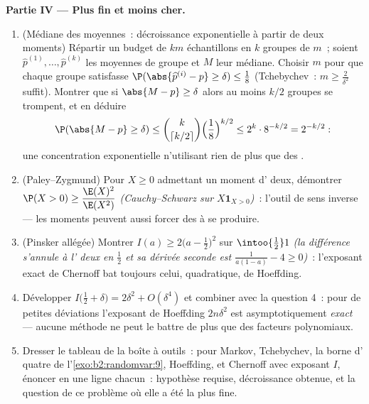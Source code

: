 \begin{problem}
\medskip
\noindent\textbf{Partie IV --- Plus fin et moins cher.}
\begin{enumerate}[resume]
  \item (Médiane des moyennes~: décroissance exponentielle à partir de deux moments)
        Répartir un budget de $km$ échantillons en $k$ groupes
         de $m$~; soient $\widehat p^{(1)}, \dots, \widehat
        p^{(k)}$ les moyennes de groupe et $M$ leur médiane.
        Choisir $m$ pour que chaque groupe satisfasse
        $\P(\abs{\widehat p^{(i)} - p} \geq \delta) \leq
        \frac18$ (Tchebychev~: $m \geq \frac2{\delta^2}$
        suffit). Montrer que si $\abs{M - p} \geq \delta$
        alors au moins $k/2$ groupes se trompent, et en déduire
        \[
        \P(\abs{M - p} \geq \delta)
        \leq \binom{k}{\lceil k/2\rceil}\Bigl(\frac18
        \Bigr)^{k/2}
        \leq 2^k\cdot 8^{-k/2} = 2^{-k/2} :
        \]
        une concentration exponentielle n'utilisant rien de plus que
        des .
  \item (Paley--Zygmund) Pour $X \geq 0$ admettant un moment d' deux,
        démontrer $\P(X > 0) \geq \dfrac{\E(X)^2}{\E(X^2)}$
        \emph{(Cauchy--Schwarz sur $X\mathbf 1_{X>0}$)}~: l'outil
        de sens inverse --- les moments peuvent aussi forcer des
         à se produire.
  \item (Pinsker allégée) Montrer $I(a) \geq 2\bigl(a -
        \tfrac12\bigr)^2$ sur $\intoo{\frac12}1$ \emph{(la
        différence s'annule à l' deux en $\frac12$ et
        sa dérivée seconde est $\frac1{a(1-a)} - 4 \geq
        0$)}~: l'exposant exact de Chernoff bat toujours
        celui, quadratique, de Hoeffding.
  \item Développer $I\bigl(\tfrac12 + \delta\bigr) = 2\delta^2 +
        O(\delta^4)$ et combiner avec la question 4~: pour de petites
        déviations l'exposant de Hoeffding $2n\delta^2$ est
        asymptotiquement \emph{exact} --- aucune méthode ne peut le battre
        de plus que des facteurs polynomiaux.
  \item Dresser le tableau de la boîte à outils~: pour Markov, Tchebychev, la
        borne d' quatre de l'\cref{exo:b2:randomvar:9},
        Hoeffding, et Chernoff avec exposant $I$, énoncer en
        une ligne chacun~: hypothèse requise, décroissance obtenue,
        et la question de ce problème où elle a été la plus
        fine.
\end{enumerate}


\end{problem}
